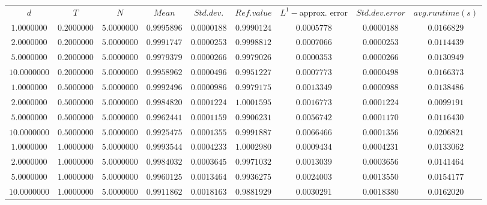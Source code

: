 \begin{tabular}{ccccccccc}
$d$ & $T$ & $N$ & $Mean$ & $Std. dev.$ & $Ref. value$ & $L^1-$approx. error & $Std. dev. error$ & $avg. runtime (s)$\\
$1.0000000$ & $0.2000000$ & $5.0000000$ & $0.9995896$ & $0.0000188$ & $0.9990124$ & $0.0005778$ & $0.0000188$ & $0.0166829$\\
$2.0000000$ & $0.2000000$ & $5.0000000$ & $0.9991747$ & $0.0000253$ & $0.9998812$ & $0.0007066$ & $0.0000253$ & $0.0114439$\\
$5.0000000$ & $0.2000000$ & $5.0000000$ & $0.9979379$ & $0.0000266$ & $0.9979026$ & $0.0000353$ & $0.0000266$ & $0.0130949$\\
$10.0000000$ & $0.2000000$ & $5.0000000$ & $0.9958962$ & $0.0000496$ & $0.9951227$ & $0.0007773$ & $0.0000498$ & $0.0166373$\\
$1.0000000$ & $0.5000000$ & $5.0000000$ & $0.9992496$ & $0.0000986$ & $0.9979175$ & $0.0013349$ & $0.0000988$ & $0.0138486$\\
$2.0000000$ & $0.5000000$ & $5.0000000$ & $0.9984820$ & $0.0001224$ & $1.0001595$ & $0.0016773$ & $0.0001224$ & $0.0099191$\\
$5.0000000$ & $0.5000000$ & $5.0000000$ & $0.9962441$ & $0.0001159$ & $0.9906231$ & $0.0056742$ & $0.0001170$ & $0.0116430$\\
$10.0000000$ & $0.5000000$ & $5.0000000$ & $0.9925475$ & $0.0001355$ & $0.9991887$ & $0.0066466$ & $0.0001356$ & $0.0206821$\\
$1.0000000$ & $1.0000000$ & $5.0000000$ & $0.9993544$ & $0.0004233$ & $1.0002980$ & $0.0009434$ & $0.0004231$ & $0.0133062$\\
$2.0000000$ & $1.0000000$ & $5.0000000$ & $0.9984032$ & $0.0003645$ & $0.9971032$ & $0.0013039$ & $0.0003656$ & $0.0141464$\\
$5.0000000$ & $1.0000000$ & $5.0000000$ & $0.9960125$ & $0.0013464$ & $0.9936275$ & $0.0024003$ & $0.0013550$ & $0.0154177$\\
$10.0000000$ & $1.0000000$ & $5.0000000$ & $0.9911862$ & $0.0018163$ & $0.9881929$ & $0.0030291$ & $0.0018380$ & $0.0162020$\\
\end{tabular}

